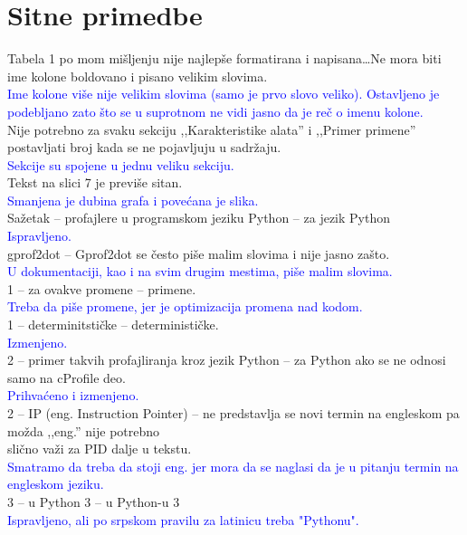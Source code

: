 \documentclass[a4paper]{report}
\newcommand{\odgovor}[1]{\textcolor{blue}{#1}}
\begin{document}
\section{Sitne primedbe}
Tabela 1 po mom mišljenju nije najlepše formatirana i napisana\ldots Ne mora biti ime kolone boldovano i pisano velikim slovima.\\
\odgovor{Ime kolone više nije velikim slovima (samo je prvo slovo veliko). Ostavljeno je podebljano zato što se u suprotnom ne vidi jasno da je reč o imenu kolone.}\\
Nije potrebno za svaku sekciju ,,Karakteristike alata'' i ,,Primer primene'' postavljati broj kada se ne pojavljuju u sadržaju.\\
\odgovor{Sekcije su spojene u jednu veliku sekciju.}\\
Tekst na slici 7 je previše sitan.\\
\odgovor{Smanjena je dubina grafa i povećana je slika.}\\
\noindent
Sažetak -- profajlere u programskom jeziku Python -- za jezik Python\\
\odgovor{Ispravljeno.}\\
gprof2dot -- Gprof2dot se često piše malim slovima i nije jasno zašto.\\
\odgovor{U dokumentaciji, kao i na svim drugim mestima, piše malim slovima.}\\
1 -- za ovakve promene -- primene.\\
\odgovor{Treba da piše promene, jer je optimizacija promena nad kodom.}\\
1 -- determinitstičke -- determinističke.\\
\odgovor{Izmenjeno.}\\
2 -- primer takvih profajliranja kroz jezik Python -- za Python ako se ne odnosi samo na cProfile deo.\\
\odgovor{Prihvaćeno i izmenjeno.}\\
2 -- IP (eng. Instruction Pointer) -- ne predstavlja se novi termin na engleskom pa možda ,,eng.'' nije potrebno\\
slično važi za PID dalje u tekstu.\\
\odgovor{Smatramo da treba da stoji eng. jer mora da se naglasi da je u pitanju termin na engleskom jeziku.}\\
3 -- u Python 3 -- u Python-u 3\\
\odgovor{Ispravljeno, ali po srpskom pravilu za latinicu treba "Pythonu".}\\
\end{document}
